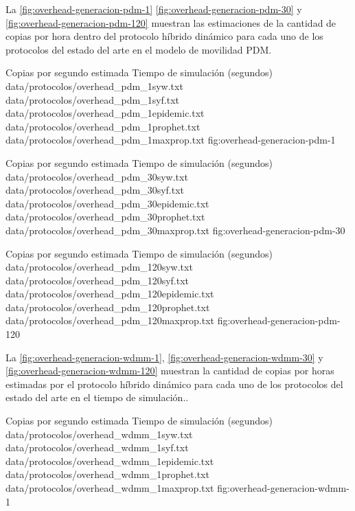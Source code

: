 La \ref{fig:overhead-generacion-pdm-1}
\ref{fig:overhead-generacion-pdm-30} y
\ref{fig:overhead-generacion-pdm-120} muestran las estimaciones de la cantidad
de copias por hora dentro del protocolo híbrido dinámico para cada uno de los
protocolos del estado del arte en el modelo de movilidad PDM.



{
\graficoEstimacio
{Copias por segundo estimada}
{Tiempo de simulación (segundos)}
{data/protocolos/overhead_pdm_1syw.txt}
{data/protocolos/overhead_pdm_1syf.txt}
{data/protocolos/overhead_pdm_1epidemic.txt}
{data/protocolos/overhead_pdm_1prophet.txt}
{data/protocolos/overhead_pdm_1maxprop.txt}
}{fig:overhead-generacion-pdm-1}



{
\graficoEstimacio
{Copias por segundo estimada}
{Tiempo de simulación (segundos)}
{data/protocolos/overhead_pdm_30syw.txt}
{data/protocolos/overhead_pdm_30syf.txt}
{data/protocolos/overhead_pdm_30epidemic.txt}
{data/protocolos/overhead_pdm_30prophet.txt}
{data/protocolos/overhead_pdm_30maxprop.txt}
}{fig:overhead-generacion-pdm-30}



{
\graficoEstimacio
{Copias por segundo estimada}
{Tiempo de simulación (segundos)}
{data/protocolos/overhead_pdm_120syw.txt}
{data/protocolos/overhead_pdm_120syf.txt}
{data/protocolos/overhead_pdm_120epidemic.txt}
{data/protocolos/overhead_pdm_120prophet.txt}
{data/protocolos/overhead_pdm_120maxprop.txt}
}{fig:overhead-generacion-pdm-120}




La \ref{fig:overhead-generacion-wdmm-1},
\ref{fig:overhead-generacion-wdmm-30} y
\ref{fig:overhead-generacion-wdmm-120} muestran la cantidad de copias por horas
estimadas por el protocolo híbrido dinámico para cada uno de los protocolos del
estado del arte en el tiempo de simulación..


{
\graficoEstimacio
{Copias por segundo estimada}
{Tiempo de simulación (segundos)}
{data/protocolos/overhead_wdmm_1syw.txt}
{data/protocolos/overhead_wdmm_1syf.txt}
{data/protocolos/overhead_wdmm_1epidemic.txt}
{data/protocolos/overhead_wdmm_1prophet.txt}
{data/protocolos/overhead_wdmm_1maxprop.txt}
}{fig:overhead-generacion-wdmm-1}



